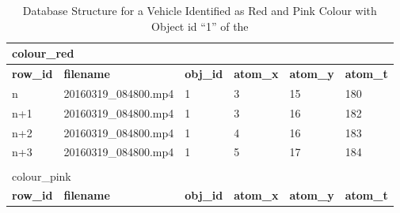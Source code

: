 \begin{table}[!hbt]
	\centering
  \caption{Database Structure for a Vehicle Identified as Red and Pink Colour
  with Object id ``1'' of the \versionOneRet}
  \label{table:dbSample}
  \begin{tabular}{llllll}
  \multicolumn{6}{l}{{ colour\_red}} \\ \hline
  \multicolumn{1}{|l|}{\textbf{row\_id}} & \multicolumn{1}{l|}{\textbf{filename}}    & \multicolumn{1}{l|}{\textbf{obj\_id}} & \multicolumn{1}{l|}{\textbf{atom\_x}} & \multicolumn{1}{l|}{\textbf{atom\_y}} & \multicolumn{1}{l|}{\textbf{atom\_t}} \\ \hline
  \multicolumn{1}{|l|}{n}                & \multicolumn{1}{l|}{20160319\_084800.mp4} & \multicolumn{1}{l|}{1}                & \multicolumn{1}{l|}{3}                & \multicolumn{1}{l|}{15}               & \multicolumn{1}{l|}{180}              \\ \hline
  \multicolumn{1}{|l|}{n+1}              & \multicolumn{1}{l|}{20160319\_084800.mp4} & \multicolumn{1}{l|}{1}                & \multicolumn{1}{l|}{3}                & \multicolumn{1}{l|}{16}               & \multicolumn{1}{l|}{182}              \\ \hline
  \multicolumn{1}{|l|}{n+2}              & \multicolumn{1}{l|}{20160319\_084800.mp4} & \multicolumn{1}{l|}{1}                & \multicolumn{1}{l|}{4}                & \multicolumn{1}{l|}{16}               & \multicolumn{1}{l|}{183}              \\ \hline
  \multicolumn{1}{|l|}{n+3}              & \multicolumn{1}{l|}{20160319\_084800.mp4} & \multicolumn{1}{l|}{1}                & \multicolumn{1}{l|}{5}                & \multicolumn{1}{l|}{17}               & \multicolumn{1}{l|}{184}              \\ \hline
                                         &                                           &                                       &                                       &                                       &                                       \\
  \multicolumn{6}{l}{{ colour\_pink}}                                                                                                                                                                                                              \\ \hline
  \multicolumn{1}{|l|}{\textbf{row\_id}} & \multicolumn{1}{l|}{\textbf{filename}}    & \multicolumn{1}{l|}{\textbf{obj\_id}} & \multicolumn{1}{l|}{\textbf{atom\_x}} & \multicolumn{1}{l|}{\textbf{atom\_y}} & \multicolumn{1}{l|}{\textbf{atom\_t}} \\ \hline

\end{tabular}
\end{table}
